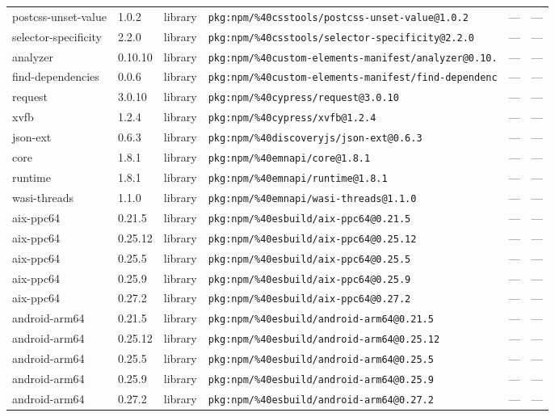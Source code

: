 \documentclass[11pt]{article}
\begin{document}
\begin{longtable}{|l|l|l|p{2.2cm}|l|p{4cm}|}
postcss-unset-value & 1.0.2 & library & \texttt{pkg:npm/\%40csstools/postcss-unset-value@1.0.2} & — & — \\
selector-specificity & 2.2.0 & library & \texttt{pkg:npm/\%40csstools/selector-specificity@2.2.0} & — & — \\
analyzer & 0.10.10 & library & \texttt{pkg:npm/\%40custom-elements-manifest/analyzer@0.10.} & — & — \\
find-dependencies & 0.0.6 & library & \texttt{pkg:npm/\%40custom-elements-manifest/find-dependenc} & — & — \\
request & 3.0.10 & library & \texttt{pkg:npm/\%40cypress/request@3.0.10} & — & — \\
xvfb & 1.2.4 & library & \texttt{pkg:npm/\%40cypress/xvfb@1.2.4} & — & — \\
json-ext & 0.6.3 & library & \texttt{pkg:npm/\%40discoveryjs/json-ext@0.6.3} & — & — \\
core & 1.8.1 & library & \texttt{pkg:npm/\%40emnapi/core@1.8.1} & — & — \\
runtime & 1.8.1 & library & \texttt{pkg:npm/\%40emnapi/runtime@1.8.1} & — & — \\
wasi-threads & 1.1.0 & library & \texttt{pkg:npm/\%40emnapi/wasi-threads@1.1.0} & — & — \\
aix-ppc64 & 0.21.5 & library & \texttt{pkg:npm/\%40esbuild/aix-ppc64@0.21.5} & — & — \\
aix-ppc64 & 0.25.12 & library & \texttt{pkg:npm/\%40esbuild/aix-ppc64@0.25.12} & — & — \\
aix-ppc64 & 0.25.5 & library & \texttt{pkg:npm/\%40esbuild/aix-ppc64@0.25.5} & — & — \\
aix-ppc64 & 0.25.9 & library & \texttt{pkg:npm/\%40esbuild/aix-ppc64@0.25.9} & — & — \\
aix-ppc64 & 0.27.2 & library & \texttt{pkg:npm/\%40esbuild/aix-ppc64@0.27.2} & — & — \\
android-arm64 & 0.21.5 & library & \texttt{pkg:npm/\%40esbuild/android-arm64@0.21.5} & — & — \\
android-arm64 & 0.25.12 & library & \texttt{pkg:npm/\%40esbuild/android-arm64@0.25.12} & — & — \\
android-arm64 & 0.25.5 & library & \texttt{pkg:npm/\%40esbuild/android-arm64@0.25.5} & — & — \\
android-arm64 & 0.25.9 & library & \texttt{pkg:npm/\%40esbuild/android-arm64@0.25.9} & — & — \\
android-arm64 & 0.27.2 & library & \texttt{pkg:npm/\%40esbuild/android-arm64@0.27.2} & — & — \\

\end{longtable}
\end{document}
